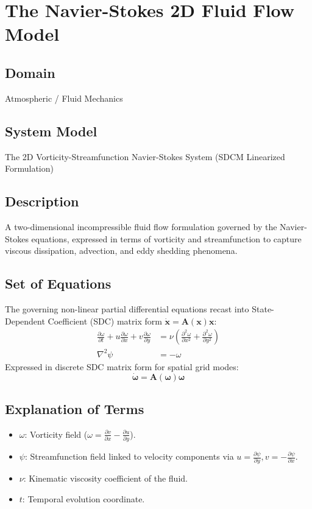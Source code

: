 \chapter{The Navier-Stokes 2D Fluid Flow Model}

\section{Domain}
Atmospheric / Fluid Mechanics

\section{System Model}
The 2D Vorticity-Streamfunction Navier-Stokes System (SDCM Linearized Formulation)

\section{Description}
A two-dimensional incompressible fluid flow formulation governed by the Navier-Stokes equations, expressed in terms of vorticity and streamfunction to capture viscous dissipation, advection, and eddy shedding phenomena.

\section{Set of Equations}
The governing non-linear partial differential equations recast into State-Dependent Coefficient (SDC) matrix form $\dot{\mathbf{x}} = \mathbf{A}(\mathbf{x})\mathbf{x}$:
\begin{align}
\frac{\partial \omega}{\partial t} + u \frac{\partial \omega}{\partial x} + v \frac{\partial \omega}{\partial y} &= \nu \left( \frac{\partial^2 \omega}{\partial x^2} + \frac{\partial^2 \omega}{\partial y^2} \right) \\
\nabla^2 \psi &= -\omega
\end{align}
Expressed in discrete SDC matrix form for spatial grid modes:
\begin{equation}
\dot{\boldsymbol{\omega}} = \mathbf{A}(\boldsymbol{\omega})\boldsymbol{\omega}
\end{equation}

\section{Explanation of Terms}
\begin{itemize}
    \item $\omega$: Vorticity field ($\omega = \frac{\partial v}{\partial x} - \frac{\partial u}{\partial y}$).
    \item $\psi$: Streamfunction field linked to velocity components via $u = \frac{\partial \psi}{\partial y}, v = -\frac{\partial \psi}{\partial x}$.
    \item $\nu$: Kinematic viscosity coefficient of the fluid.
    \item $t$: Temporal evolution coordinate.
\end{itemize}

